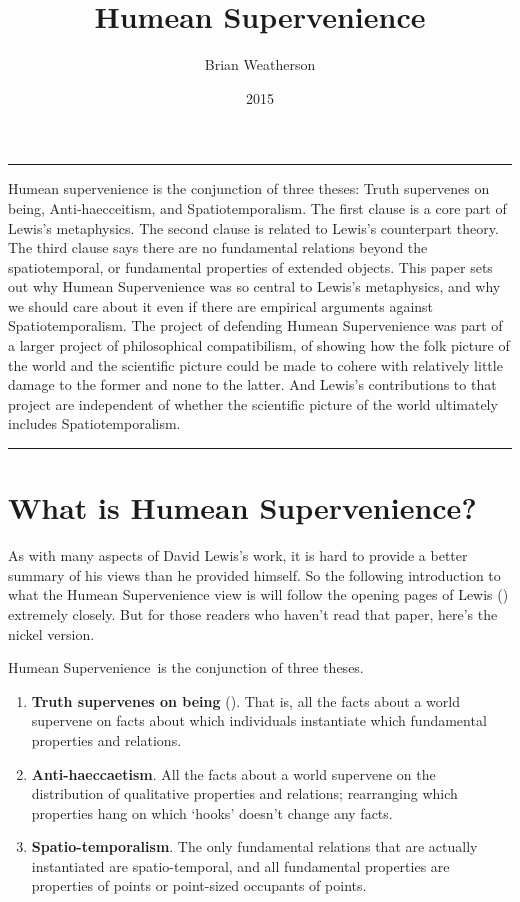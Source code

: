 \documentclass[
  10pt,
  letterpaper,
  DIV=11,
  numbers=noendperiod,
  twoside]{scrartcl}
\title{Humean Supervenience}
\author{Brian Weatherson}
\date{2015}
\providecommand{\tightlist}{%
  \setlength{\itemsep}{0pt}\setlength{\parskip}{0pt}}\usepackage{longtable,booktabs,array}
\renewenvironment{abstract}
 {\vspace{-1.25cm}
 \quotation\small\noindent\rule{\linewidth}{.5pt}\par\smallskip
 \noindent }
 {\par\noindent\rule{\linewidth}{.5pt}\endquotation}
\begin{document}
\maketitle
\begin{abstract}
Humean supervenience is the conjunction of three theses: Truth
supervenes on being, Anti‐haecceitism, and Spatiotemporalism. The first
clause is a core part of Lewis's metaphysics. The second clause is
related to Lewis's counterpart theory. The third clause says there are
no fundamental relations beyond the spatiotemporal, or fundamental
properties of extended objects. This paper sets out why Humean
Supervenience was so central to Lewis's metaphysics, and why we should
care about it even if there are empirical arguments against
Spatiotemporalism. The project of defending Humean Supervenience was
part of a larger project of philosophical compatibilism, of showing how
the folk picture of the world and the scientific picture could be made
to cohere with relatively little damage to the former and none to the
latter. And Lewis's contributions to that project are independent of
whether the scientific picture of the world ultimately includes
Spatiotemporalism.
\end{abstract}


\section{What is Humean
Supervenience?}\label{what-is-humean-supervenience}

As with many aspects of David Lewis's work, it is hard to provide a
better summary of his views than he provided himself. So the following
introduction to what the Humean Supervenience view is will follow the
opening pages of Lewis () extremely
closely. But for those readers who haven't read that paper, here's the
nickel version.

Humean Supervenience~is the conjunction of three theses.

\begin{enumerate}
\def\labelenumi{\arabic{enumi}.}
\tightlist
\item
  \textbf{Truth supervenes on being} (). That is, all the facts about a world supervene on facts about
  which individuals instantiate which fundamental properties and
  relations.
\item
  \textbf{Anti-haeccaetism}. All the facts about a world supervene on
  the distribution of qualitative properties and relations; rearranging
  which properties hang on which `hooks' doesn't change any facts.
\item
  \textbf{Spatio-temporalism}. The only fundamental relations that are
  actually instantiated are spatio-temporal, and all fundamental
  properties are properties of points or point-sized occupants of
  points.
\end{enumerate}
\end{document}
